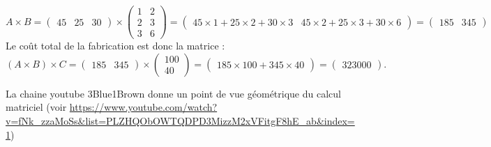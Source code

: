 \documentclass{book}
\begin{document}
\begin{Exemple}
$$ A\times B = \begin{pmatrix}
45& 25 & 30\end{pmatrix}\times \begin{pmatrix}
1& 2 \\
2 &3 \\
3& 6
\end{pmatrix} =  \begin{pmatrix}
45\times 1 + 25\times 2 + 30 \times 3   & 45\times 2 + 25\times 3 + 30 \times 6\end{pmatrix}=\begin{pmatrix} 185 & 345\end{pmatrix}  
$$
Le coût total de la fabrication est donc la matrice :
$$(A\times B)\times C= \begin{pmatrix} 185 & 345\end{pmatrix} \times  \begin{pmatrix} 100 \\ 40\end{pmatrix} =\begin{pmatrix} 185\times 100+ 345\times40\end{pmatrix}= \begin{pmatrix} 323000\end{pmatrix}.$$
\end{Exemple}
\begin{Exemple}
La chaine  youtube 3Blue1Brown donne un point de vue géométrique du calcul matriciel (voir \url{https://www.youtube.com/watch?v=fNk_zzaMoSs&list=PLZHQObOWTQDPD3MizzM2xVFitgF8hE_ab&index=1}) 
\end{Exemple}
\end{document}
